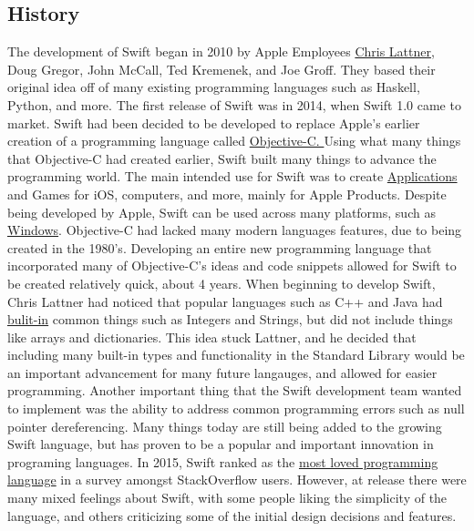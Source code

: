 \documentclass{article}
\theoremstyle{theorem}
\theoremstyle{definition}
\theoremstyle{remark}
\begin{document}
\subsection{History}
The development of Swift began in 2010 by Apple Employees \href{https://nondot.org/~sabre/}{Chris Lattner}, Doug Gregor, John McCall, Ted Kremenek, and Joe Groff. They based their original idea off of many existing programming languages such as Haskell, Python, and more. The first release of Swift was in 2014, when Swift 1.0 came to market. Swift had been decided to be developed to replace Apple's earlier creation of a programming language called \href{https://en.wikipedia.org/wiki/Objective-C#:~:text=10%20External%20links-,History,Programming%20Technology%20Center%20in%201981.}{Objective-C. }
Using what many things that Objective-C had created earlier, Swift built many things to advance the programming world. The main intended use for Swift was to create \href{https://www.swift.org/about/}{Applications} and Games for iOS, computers, and more, mainly for Apple Products. Despite being developed by Apple, Swift can be used across many platforms, such as \href{https://www.swift.org/blog/swift-on-windows/}{Windows}. Objective-C had lacked many modern languages features, due to being created in the 1980's. Developing an entire new programming language that incorporated many of Objective-C's ideas and code snippets allowed for Swift to be created relatively quick, about 4 years. When beginning to develop Swift, Chris Lattner had noticed that popular languages such as C++ and Java had \href{https://www.hackingwithswift.com/interviews/chris-lattner-how-did-you-start-creating-swift}{bulit-in} common things such as Integers and Strings, but did not include things like arrays and dictionaries. This idea stuck Lattner, and he decided that including many built-in types and functionality in the Standard Library would be an important advancement for many future langauges, and allowed for easier programming. Another important thing that the Swift development team wanted to implement was the ability to address common programming errors such as null pointer dereferencing. Many things today are still being added to the growing Swift language, but has proven to be a popular and important innovation in programing languages. In 2015, Swift ranked as the \href{https://stackoverflow.blog/2015/04/07/stack-overflow-developer-survey-2015-the-results/}{most loved programming language} in a survey amongst StackOverflow users. However, at release there were many mixed feelings about Swift, with some people liking the simplicity of the language, and others criticizing some of the initial design decisions and features.
\end{document}
